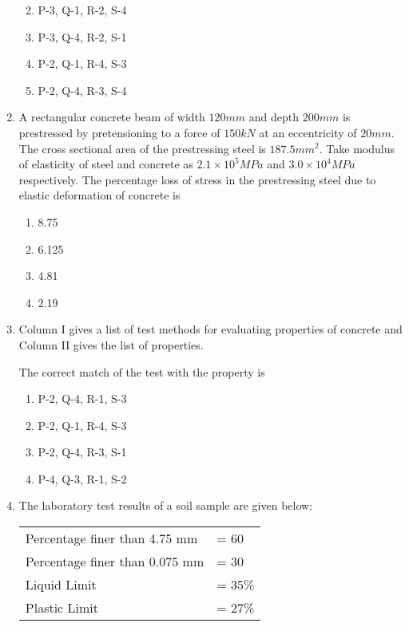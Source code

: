 \documentclass[journal]{IEEEtran}
\begin{document}
\begin{enumerate}[start=25]
\begin{enumerate}
\begin{figure}[!ht]
\label{fig:my_label}
\end{figure}
    \item P-3, Q-1, R-2, S-4
    \item P-3, Q-4, R-2, S-1
    \item P-2, Q-1, R-4, S-3
    \item P-2, Q-4, R-3, S-4
\end{enumerate}
\item A rectangular concrete beam of width $120 mm$ and depth $200 mm$ is prestressed by pretensioning to a force of $150 kN$ at an eccentricity of $20 mm$. The cross sectional area of the prestressing steel is $187.5 mm^2$. Take modulus of elasticity of steel and concrete as $2.1\times10^5 MPa$ and $3.0\times10^4 MPa$ respectively. The percentage loss of stress in the prestressing steel due to elastic deformation of concrete is
\begin{enumerate}
    \item 8.75
    \item 6.125
    \item 4.81
    \item 2.19
\end{enumerate}
\item Column I gives a list of test methods for evaluating properties of concrete and Column II gives the list of properties.
\begin{table}[H]
    \centering
    
    \caption{}
    \label{tab:my_label}
\end{table}
The correct match of the test with the property is
\begin{enumerate}
    \item P-2, Q-4, R-1, S-3
    \item P-2, Q-1, R-4, S-3
    \item P-2, Q-4, R-3, S-1
    \item P-4, Q-3, R-1, S-2
\end{enumerate}
\item The laboratory test results of a soil sample are given below:
\begin{center}
\begin{tabular}{l l}
    Percentage finer than 4.75 mm & = 60 \\
    Percentage finer than 0.075 mm & = 30 \\
    Liquid Limit & = 35\% \\
    Plastic Limit & = 27\%
\end{tabular}
\end{center}

\end{enumerate}
\end{document}

